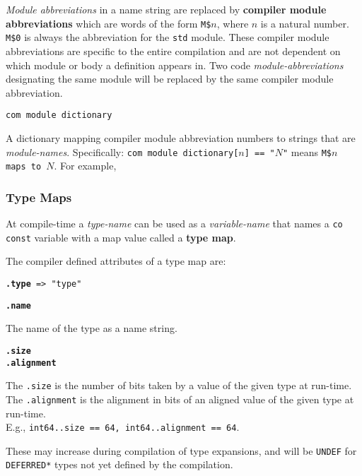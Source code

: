\documentclass[12pt]{article}
\newcommand{\key}[1]{{\rm \bfseries #1}}
\newcommand{\ttkey}[1]{{\tt \bfseries #1}}
\newenvironment{indpar}[1][0.3in]%
	{\begin{list}{}%
		     {\setlength{\itemsep}{0in}%
		      \setlength{\topsep}{0in}%
		      \setlength{\parsep}{1ex}%
		      \setlength{\labelwidth}{#1}%
		      \setlength{\leftmargin}{#1}%
		      \addtolength{\leftmargin}{\labelsep}}%
	 \item}%
	{\end{list}}
\begin{document}
{\em Module abbreviations} in a name string are
replaced by \key{compiler module abbreviations}
which are words of the form {\tt M\$$n$}, where
$n$ is a natural number.  {\tt M\$0} is always
the abbreviation for the {\tt std} module.
These compiler module abbreviations are specific to the
entire compilation and are not dependent on which
module or body a definition appears in.
Two code {\em module-abbreviations} designating the same
module will be replaced by the same compiler module abbreviation.

{\tt com module dictionary}
\begin{indpar}
A dictionary mapping compiler module abbreviation numbers
to strings that are {\em mod\-ule-names}.  Specifically:
{\tt com module dictionary[$n$] == "$N$"}
means {\tt M\$$n$ \rm{maps to} $N$}.
For example,
\\[0.5ex]
\hspace*{1.5in}{\tt com module dictionary[0] == "standard"}

\end{indpar}

\subsubsection{Type Maps}
\label{TYPE-MAPS}

At compile-time a {\em type-name} can be used as a
{\em variable-name} that names a {\tt co} {\tt const} variable
with a map value called a \key{type map}.

The compiler defined attributes of a type map are:

{\tt \ttkey{.type} => "type"}

\ttkey{.name}
\begin{indpar}
The name of the type as a name string.
\end{indpar}

\ttkey{.size} \\
\ttkey{.alignment}
\begin{indpar}\label{SIZE-AND-ALIGNMENT}
The {\tt .size} is the number of bits taken by a value of the given type at
run-time.
The {\tt .alignment} is the alignment in bits
of an aligned value of the given type at
run-time.
\\ E.g., {\tt int64..size == 64, int64..alignment == 64}.

These may increase during compilation of type expansions, and will be
{\tt UNDEF} for {\tt *DEFERRED*} types not yet defined by the
compilation.
\end{indpar}
\end{document}
